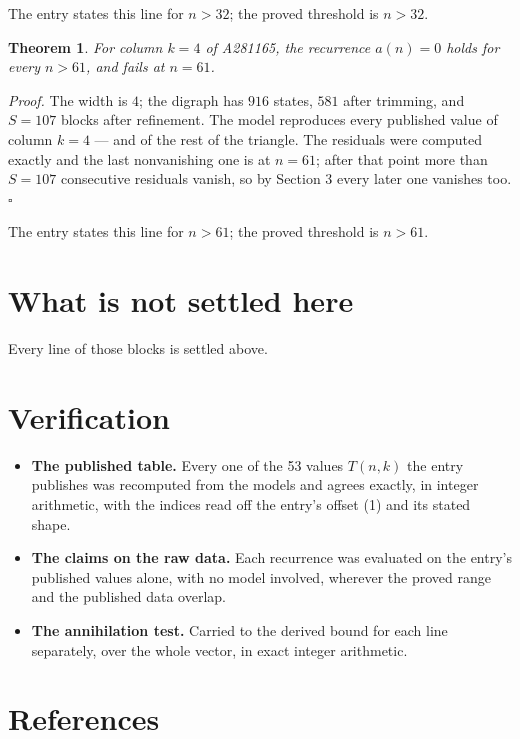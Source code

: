\documentclass[11pt]{article}
\newtheorem{theorem}{Theorem}
\theoremstyle{definition}
\begin{document}
The entry states this line for $n > 32$; the proved threshold is $n > 32$.

\begin{theorem} For column $k = 4$ of A281165, the recurrence $a(n) = 0$ holds for every $n > 61$, and fails at $n = 61$.\end{theorem}

{\itshape Proof.} The width is $4$; the digraph has $916$ states, $581$ after trimming, and $S = 107$ blocks after refinement. The model reproduces every published value of column $k = 4$ --- and of the rest of the triangle. The residuals were computed exactly and the last nonvanishing one is at $n = 61$; after that point more than $S = 107$ consecutive residuals vanish, so by Section 3 every later one vanishes too. $\square$

The entry states this line for $n > 61$; the proved threshold is $n > 61$.

\section{What is not settled here}

Every line of those blocks is settled above.

\section{Verification}

\begin{itemize}

\item {\bfseries The published table.} Every one of the 53 values $T(n,k)$ the entry publishes was recomputed from the models and agrees exactly, in integer arithmetic, with the indices read off the entry's offset (1) and its stated shape.

\item {\bfseries The claims on the raw data.} Each recurrence was evaluated on the entry's published values alone, with no model involved, wherever the proved range and the published data overlap.

\item {\bfseries The annihilation test.} Carried to the derived bound for each line separately, over the whole vector, in exact integer arithmetic.

\end{itemize}

\section{References}
\end{document}
